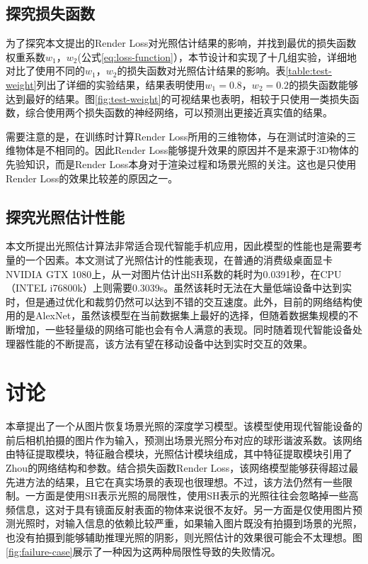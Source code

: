 \subsection{探究损失函数}

为了探究本文提出的Render Loss对光照估计结果的影响，并找到最优的损失函数权重系数$w_1$，$w_2$(公式\ref{eq:loss-function}），本节设计和实现了十几组实验，详细地对比了使用不同的$w_1$，$w_2$的损失函数对光照估计结果的影响。表\ref{table:test-weight}列出了详细的实验结果，结果表明使用$w_1=0.8$，$w_2=0.2$的损失函数能够达到最好的结果。图\ref{fig:test-weight}的可视结果也表明，相较于只使用一类损失函数，综合使用两个损失函数的神经网络，可以预测出更接近真实值的结果。



需要注意的是，在训练时计算Render Loss所用的三维物体，与在测试时渲染的三维物体是不相同的。因此Render Loss能够提升效果的原因并不是来源于3D物体的先验知识，而是Render Loss本身对于渲染过程和场景光照的关注。这也是只使用Render Loss的效果比较差的原因之一。
\subsection{探究光照估计性能}
本文所提出光照估计算法非常适合现代智能手机应用，因此模型的性能也是需要考量的一个因素。本文测试了光照估计的性能表现，在普通的消费级桌面显卡NVIDIA GTX 1080上，从一对图片估计出SH系数的耗时为0.0391秒，在CPU（INTEL i76800k）上则需要0.3039s。虽然该耗时无法在大量低端设备中达到实时，但是通过优化和裁剪仍然可以达到不错的交互速度。此外，目前的网络结构使用的是AlexNet，虽然该模型在当前数据集上最好的选择，但随着数据集规模的不断增加，一些轻量级的网络可能也会有令人满意的表现。同时随着现代智能设备处理器性能的不断提高，该方法有望在移动设备中达到实时交互的效果。
\section{讨论}
本章提出了一个从图片恢复场景光照的深度学习模型。该模型使用现代智能设备的前后相机拍摄的图片作为输入，预测出场景光照分布对应的球形谐波系数。该网络由特征提取模块，特征融合模块，光照估计模块组成，其中特征提取模块引用了Zhou\cite{zhou2017places}的网络结构和参数。结合损失函数Render Loss，该网络模型能够获得超过最先进方法的结果，且它在真实场景的表现也很理想。不过，该方法仍然有一些限制。一方面是使用SH表示光照的局限性，使用SH表示的光照往往会忽略掉一些高频信息，这对于具有镜面反射表面的物体来说很不友好。另一方面是仅使用图片预测光照时，对输入信息的依赖比较严重，如果输入图片既没有拍摄到场景的光照，也没有拍摄到能够辅助推理光照的阴影，则光照估计的效果很可能会不太理想。图\ref{fig:failure-case}展示了一种因为这两种局限性导致的失败情况。



